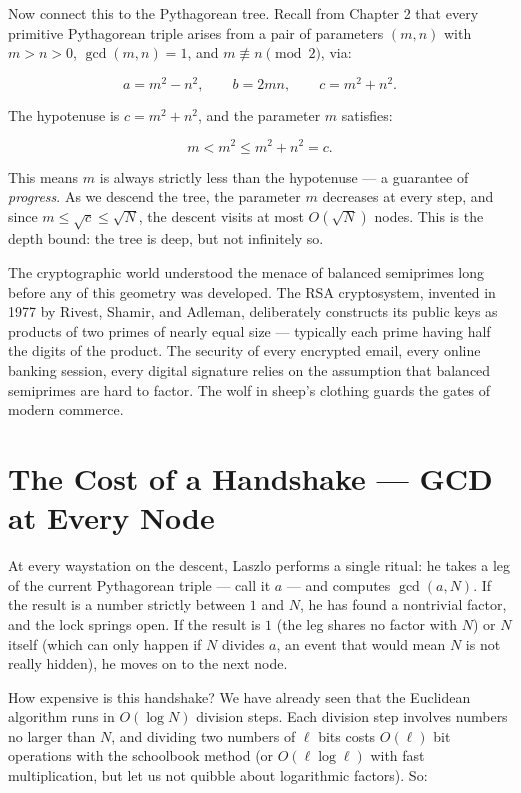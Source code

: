 \documentclass[11pt,twoside,openright]{book}
\theoremstyle{definition}
\theoremstyle{remark}
\begin{document}
Now connect this to the Pythagorean tree. Recall from Chapter 2 that every primitive Pythagorean triple arises from a pair of parameters $(m, n)$ with $m > n > 0$, $\gcd(m, n) = 1$, and $m \not\equiv n \pmod{2}$, via:

\[a = m^2 - n^2, \qquad b = 2mn, \qquad c = m^2 + n^2.\]

The hypotenuse is $c = m^2 + n^2$, and the parameter $m$ satisfies:

\[m < m^2 \le m^2 + n^2 = c.\]

This means $m$ is always strictly less than the hypotenuse --- a guarantee of \textit{progress}. As we descend the tree, the parameter $m$ decreases at every step, and since $m \le \sqrt{c} \le \sqrt{N}$, the descent visits at most $O(\sqrt{N})$ nodes. This is the depth bound: the tree is deep, but not infinitely so.

The cryptographic world understood the menace of balanced semiprimes long before any of this geometry was developed. The RSA cryptosystem, invented in 1977 by Rivest, Shamir, and Adleman, deliberately constructs its public keys as products of two primes of nearly equal size --- typically each prime having half the digits of the product. The security of every encrypted email, every online banking session, every digital signature relies on the assumption that balanced semiprimes are hard to factor. The wolf in sheep's clothing guards the gates of modern commerce.




\section{The Cost of a Handshake --- GCD at Every Node}

At every waystation on the descent, Laszlo performs a single ritual: he takes a leg of the current Pythagorean triple --- call it $a$ --- and computes $\gcd(a, N)$. If the result is a number strictly between $1$ and $N$, he has found a nontrivial factor, and the lock springs open. If the result is $1$ (the leg shares no factor with $N$) or $N$ itself (which can only happen if $N$ divides $a$, an event that would mean $N$ is not really hidden), he moves on to the next node.

How expensive is this handshake? We have already seen that the Euclidean algorithm runs in $O(\log N)$ division steps. Each division step involves numbers no larger than $N$, and dividing two numbers of $\ell$ bits costs $O(\ell)$ bit operations with the schoolbook method (or $O(\ell \log \ell)$ with fast multiplication, but let us not quibble about logarithmic factors). So:
\end{document}

